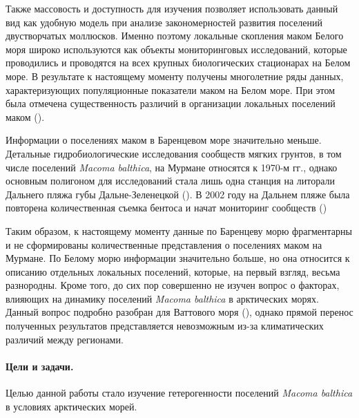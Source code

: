 Также массовость и доступность для изучения позволяет использовать данный вид как удобную модель при анализе закономерностей развития поселений двустворчатых моллюсков. 
Именно поэтому локальные скопления маком Белого моря широко используются как объекты мониторинговых исследований, которые проводились и проводятся на всех крупных биологических стационарах на Белом море. 
В результате к настоящему моменту получены многолетние ряды данных, характеризующих  популяционные показатели маком на Белом море. 
При этом была отмечена существенность различий в организации локальных поселений маком (\cite{Semenova_1974, Maximovich_Kunina_1982, Maximovich_et_al_1991, Poloskin_1996, Nikolaeva_1998, Nazarova_2003, Nazarova_Poloskin_2005}).
 
Информации о поселениях маком в Баренцевом море значительно меньше. 
Детальные гидробиологические исследования сообществ мягких грунтов, в том числе  поселений {\it Macoma balthica}, на Мурмане относятся к 1970-м гг., однако основным полигоном для исследований стала лишь одна станция на литорали Дальнего пляжа губы Дальне-Зеленецкой (\cite{Agarova_et_al_1976}).
В 2002 году на Дальнем пляже была повторена количественная съемка бентоса и начат мониторинг сообществ (\cite{Genelt_Dalnezeleneckaya_2008})

Таким образом, к настоящему моменту данные по Баренцеву морю фрагментарны и не сформированы количественные представления о поселениях маком на Мурмане. 
По Белому морю информации значительно больше, но она относится к описанию отдельных локальных поселений, которые, на первый взгляд, весьма разнородны. 
Кроме того, до сих пор совершенно не изучен вопрос о факторах, влияющих на динамику поселений {\it Macoma balthica} в арктических морях. 
Данный вопрос подробно разобран для Ваттового моря (\cite{Hiddink_et_al_2002_predation_epifauna, Hiddink_et_al_2002_predation_infauna, Beukema_et_al_2009}), однако прямой перенос полученных результатов представляется невозможным из-за климатических различий между регионами.


\paragraph{Цели и задачи.}
Целью данной работы стало изучение гетерогенности поселений {\it Macoma balthica} в условиях арктических морей.

